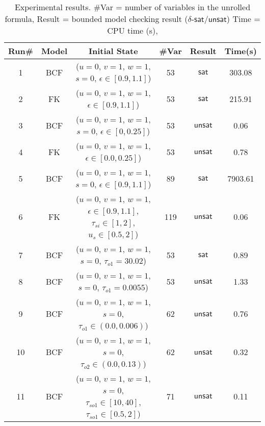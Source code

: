 {\small
\begin{table}[!th]
  \centering
  \small
  \begin{tabular}{c|c|c|c|c|c}
    \hline
    \hline
    Run\# & Model   & Initial State  & \#Var  & Result   & Time(s)   \\
    \hline
    \hline
    1 & BCF & ($u = 0$, $v = 1$, $w = 1$, $s = 0$, $\epsilon \in [0.9,1.1]$) & 53  & $\mathsf{sat}$  & 303.08 \\
    2 & FK & ($u = 0$, $v = 1$, $w = 1$, $\epsilon \in [0.9,1.1]$)  & 53 & $\mathsf{sat}$ & 215.91 \\
    3 & BCF & ($u = 0$, $v = 1$, $w = 1$, $s = 0$, $\epsilon \in [0,0.25]$) & 53  & $\mathsf{unsat}$  & 0.06 \\
    4 & FK & ($u = 0$, $v = 1$, $w = 1$, $\epsilon \in [0.0,0.25]$)  & 53 & $\mathsf{unsat}$ & 0.78 \\
    5 & BCF & ($u = 0$, $v = 1$, $w = 1$, $s = 0$, $\epsilon \in [0.9,1.1]$)  & 89  & $\mathsf{sat}$  & 7903.61 \\
    6 & FK & ($u = 0$, $v = 1$, $w = 1$, $\epsilon \in [0.9,1.1]$, $\tau_{si} \in [1,2]$, $u_{s} \in [0.5,2]$)  & 119 & $\mathsf{unsat}$ & 0.06 \\   
    7 & BCF & ($u = 0$, $v = 1$, $w = 1$, $s = 0$, $\tau_{o1} = 30.02$) & 53  & $\mathsf{sat}$  & 0.89 \\        
    8 & BCF & ($u = 0$, $v = 1$, $w = 1$, $s = 0$, $\tau_{o1} = 0.0055$) & 53  & $\mathsf{unsat}$  & 1.33 \\        
    9 & BCF & ($u = 0$, $v = 1$, $w = 1$, $s = 0$, $\tau_{o1} \in (0.0, 0.006)$) & 62  & $\mathsf{unsat}$  & 0.76 \\        
    10 & BCF & ($u = 0$, $v = 1$, $w = 1$, $s = 0$, $\tau_{o2} \in (0.0, 0.13)$)  & 62  & $\mathsf{unsat}$  & 0.32 \\     
    11 & BCF & ($u = 0$, $v = 1$, $w = 1$, $s = 0$, $\tau_{so1} \in [10, 40]$, $\tau_{so1}\in [0.5, 2]$) & 71  & $\mathsf{unsat}$  & 0.11 \\   
    \hline
    \hline
  \end{tabular}
  \caption{\small Experimental results.
    \#Var = number of variables in the unrolled formula,
    Result = bounded model checking result ($\delta$-$\mathsf{sat}$/$\mathsf{unsat}$)
    Time = CPU time (s),
}\label{tbl:exp}
\end{table}
}

